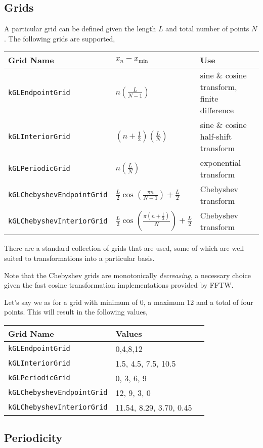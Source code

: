 \documentclass[11pt]{article}
\begin{document}
\subsection{Grids}

A particular grid can be defined given the length $L$ and total number of points $N$. The following grids are supported,

\begin{tabular}{lllL}
      \hline
      Grid Name &$x_n-x_{\textrm{min}}$ & Use \tabularnewline \hline \hline
      \verb"kGLEndpointGrid" & $n \left(\frac{L}{N-1}\right)$ & sine \& cosine transform, finite difference \tabularnewline
      \verb"kGLInteriorGrid" & $\left(n + \frac{1}{2} \right) \left(\frac{L}{N}\right)$ & sine \& cosine half-shift transform \tabularnewline
      \verb"kGLPeriodicGrid" & $n \left(\frac{L}{N}\right)$ & exponential transform \tabularnewline
      \verb"kGLChebyshevEndpointGrid" & $ \frac{L}{2} \cos{ \left( \frac{\pi n}{N-1} \right) + \frac{L}{2}}$ & Chebyshev transform \tabularnewline
      \verb"kGLChebyshevInteriorGrid" & $\frac{L}{2} \cos{ \left( \frac{\pi (n+\frac{1}{2})}{N} \right) + \frac{L}{2} }$ & Chebyshev transform \tabularnewline
      \hline
\end{tabular}

There are a standard collection of grids that are used, some of which are well suited to transformations into a particular basis.

Note that the Chebyshev grids are monotonically \emph{decreasing}, a necessary choice given the fast cosine transformation implementations provided by FFTW.

Let's say we as for a grid with minimum of 0, a maximum 12 and a total of four points. This will result in the following values,

\begin{tabular}{llL}
      \hline
      Grid Name &Values \tabularnewline \hline \hline
      \verb"kGLEndpointGrid" & 0,4,8,12 \tabularnewline
      \verb"kGLInteriorGrid" & 1.5, 4.5, 7.5, 10.5 \tabularnewline
      \verb"kGLPeriodicGrid" & 0, 3, 6, 9 \tabularnewline
      \verb"kGLChebyshevEndpointGrid" & 12, 9, 3, 0 \tabularnewline
      \verb"kGLChebyshevInteriorGrid" & 11.54, 8.29, 3.70, 0.45 \tabularnewline
      \hline
\end{tabular}

\subsection{Periodicity}
\end{document}

